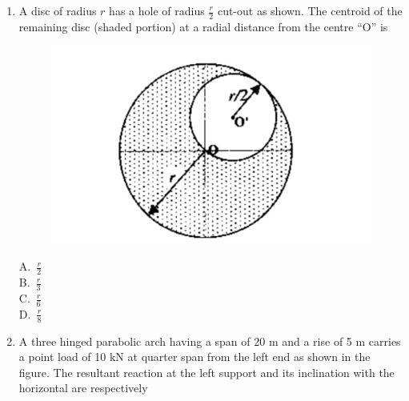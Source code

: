 \documentclass[journal,12pt,onecolumn]{IEEEtran}
\theoremstyle{remark}
\begin{document}
\begin{enumerate}
\begin{multicols}{4}
A.\ zero \\
B.\ $M$ \\
C.\ $ML$ \\
D.\ $M/L$
\end{multicols}

\noindent\item A disc of radius $r$ has a hole of radius $\frac{r}{2}$ cut-out as shown. The centroid of the remaining disc (shaded portion) at a radial distance from the centre “O” is

\hfill{}

\begin{figure}[H]
     \centering
     \includegraphics[scale=0.55]{figs/412a18c6-0377-40d3-8e64-77d6fc371075.jpg} 
     \caption{}
     \label{fig:figure6}
 \end{figure}

\begin{multicols}{4}
A.\ $\frac{r}{2}$ \\
B.\ $\frac{r}{3}$ \\
C.\ $\frac{r}{6}$ \\
D.\ $\frac{r}{8}$
\end{multicols}


\noindent\item A three hinged parabolic arch having a span of 20 m and a rise of 5 m carries a point load of 10 kN at quarter span from the left end as shown in the figure. The resultant reaction at the left support and its inclination with the horizontal are respectively
\hfill{}


\end{enumerate}
\end{document}
